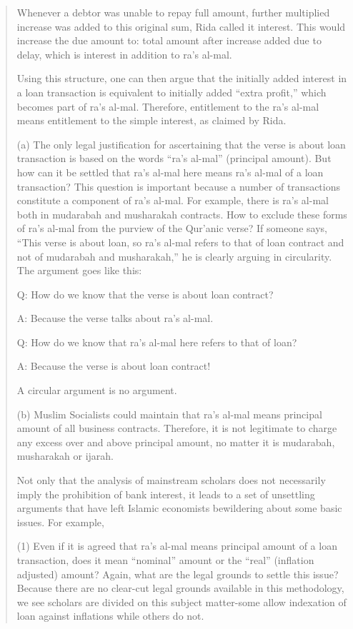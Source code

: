 \begin{quote}
Whenever a debtor was unable to repay full amount, further multiplied increase was added to this original sum, Rida called it interest. This would increase the due amount to: total amount after increase added due to delay, which is interest in addition to ra's al-mal.

Using this structure, one can then argue that the initially added interest in a loan transaction is equivalent to initially added “extra profit,” which becomes part of ra's al-mal. Therefore, entitlement to the ra's al-mal means entitlement to the simple interest, as claimed by Rida.

(a) The only legal justification for ascertaining that the verse is about loan transaction is based on the words “ra's al-mal” (principal amount). But how can it be settled that ra's al-mal here means ra's al-mal of a loan transaction? This question is important because a number of transactions constitute a component of ra's al-mal. For example, there is ra's al-mal both in mudarabah and musharakah contracts. How to exclude these forms of ra's al-mal from the purview of the Qur'anic verse? If someone says, “This verse is about loan, so ra's al-mal refers to that of loan contract and not of mudarabah and musharakah,” he is clearly arguing in circularity. The argument goes like this:

Q: How do we know that the verse is about loan contract?

A: Because the verse talks about ra's al-mal.

Q: How do we know that ra's al-mal here refers to that of loan?

A: Because the verse is about loan contract!

A circular argument is no argument.

(b) Muslim Socialists could maintain that ra's al-mal means principal amount of all business contracts. Therefore, it is not legitimate to charge any excess over and above principal amount, no matter it is mudarabah, musharakah or ijarah.

Not only that the analysis of mainstream scholars does not necessarily imply the prohibition of bank interest, it leads to a set of unsettling arguments that have left Islamic economists bewildering about some basic issues. For example,

(1) Even if it is agreed that ra's al-mal means principal amount of a loan transaction, does it mean “nominal” amount or the “real” (inflation adjusted) amount? Again, what are the legal grounds to settle this issue? Because there are no clear-cut legal grounds available in this methodology, we see scholars are divided on this subject matter-some allow indexation of loan against inflations while others do not.


\end{quote}
